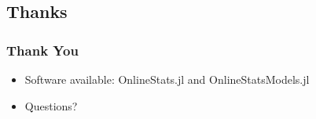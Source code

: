 \documentclass{beamer}
\begin{document}
\subsection{Thanks}
\begin{frame}
  \frametitle{Thank You}
  \begin{itemize}
    \item Software available: OnlineStats.jl and OnlineStatsModels.jl
    \item Questions?
  \end{itemize}
\end{frame}


%
%
%
%
%
%
%
\end{document}
